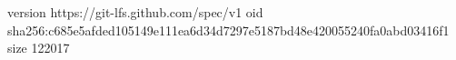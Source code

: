 version https://git-lfs.github.com/spec/v1
oid sha256:c685e5afded105149e111ea6d34d7297e5187bd48e420055240fa0abd03416f1
size 122017
